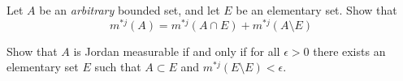 \begin{exerc}[Tao, Ex 1.1.19]
  Let $A$ be an \emph{arbitrary} bounded set, and let $E$ be an elementary set. Show that
  \[m^{*j}(A)=m^{*j}(A\cap E)+m^{*j}(A\setminus E)
  \]
\end{exerc}

\begin{exerc}
  Show that $A$ is Jordan measurable if and only if for all $\epsilon>0$ there exists an elementary set $E$ such that $A\subset E$ and $m^{*j}(E\setminus E)<\epsilon$.
\end{exerc}

\newpage